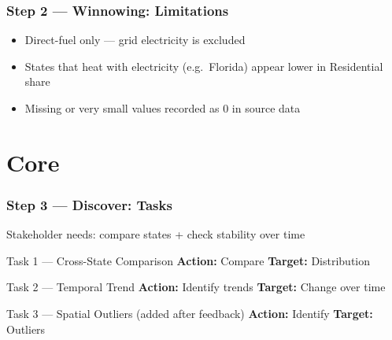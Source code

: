 \documentclass{beamer}
\begin{document}
\begin{frame}
    \frametitle{Step 2 --- Winnowing: Limitations}

    \bigskip

    \begin{itemize}
        \item \alert{Direct-fuel only} --- grid electricity is excluded

        \bigskip
        \item States that heat with electricity (e.g.\ Florida) appear lower in Residential share

        \bigskip
        \item Missing or very small values recorded as 0 in source data
    \end{itemize}
\end{frame}


\section{Core}

\begin{frame}
    \frametitle{Step 3 --- Discover: Tasks}

    Stakeholder needs: compare states + check stability over time

    \bigskip

    \begin{block}{Task 1 --- Cross-State Comparison}
        \textbf{Action:} Compare \quad \textbf{Target:} Distribution
    \end{block}

    \bigskip

    \begin{block}{Task 2 --- Temporal Trend}
        \textbf{Action:} Identify trends \quad \textbf{Target:} Change over time
    \end{block}

    \bigskip

    \begin{block}{Task 3 --- Spatial Outliers {\small(added after feedback)}}
        \textbf{Action:} Identify \quad \textbf{Target:} Outliers
    \end{block}
\end{frame}
\end{document}
